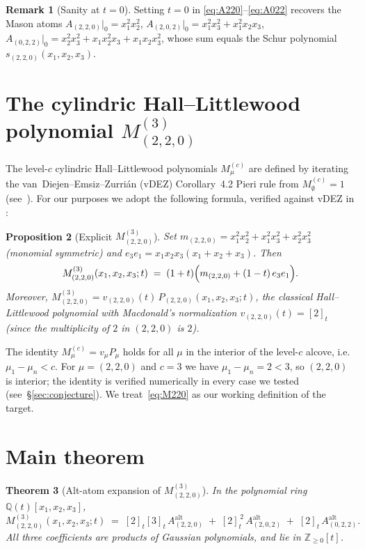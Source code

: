 \documentclass[11pt]{article}
\newtheorem{theorem}{Theorem}
\newtheorem{proposition}[theorem]{Proposition}
\theoremstyle{definition}
\newtheorem{remark}[theorem]{Remark}
\newcommand{\gauss}[1]{[#1]_t}
\newcommand{\Aalt}{A^{\mathrm{alt}}}
\newcommand{\Cmu}{M^{(c)}_{\mu}}
\newcommand{\ZZ}{\mathbb{Z}}
\newcommand{\QQ}{\mathbb{Q}}
\begin{document}
\begin{remark}[Sanity at $t=0$]
Setting $t=0$ in \eqref{eq:A220}--\eqref{eq:A022} recovers the Mason atoms
$A_{(2,2,0)}|_0=x_1^2 x_2^2$, $A_{(2,0,2)}|_0=x_1^2 x_3^2 + x_1^2 x_2 x_3$,
$A_{(0,2,2)}|_0=x_2^2 x_3^2 + x_1 x_2^2 x_3 + x_1 x_2 x_3^2$, whose sum
equals the Schur polynomial $s_{(2,2,0)}(x_1,x_2,x_3)$.
\end{remark}

\section{The cylindric Hall--Littlewood polynomial $M^{(3)}_{(2,2,0)}$}

The level-$c$ cylindric Hall--Littlewood polynomials $\Cmu$ are defined by iterating
the van~Diejen--Emsiz--Zurri\'an (vDEZ) Corollary~4.2 Pieri rule from $M^{(c)}_\emptyset=1$
(see~\cite{vDEZ}). For our purposes we adopt the following formula, verified against
vDEZ in \cite[07-21 ter memo]{Clio2026}:

\begin{proposition}[Explicit $M^{(3)}_{(2,2,0)}$]
\label{prop:M220}
Set $m_{(2,2,0)}=x_1^2 x_2^2 + x_1^2 x_3^2 + x_2^2 x_3^2$ (monomial symmetric) and
$e_3 e_1 = x_1 x_2 x_3(x_1+x_2+x_3)$. Then
\begin{equation}\label{eq:M220}
   M^{(3)}_{(2,2,0)}(x_1,x_2,x_3;t) \;=\; (1+t)\Bigl(m_{(2,2,0)} + (1-t)\,e_3 e_1\Bigr).
\end{equation}
Moreover, $M^{(3)}_{(2,2,0)} = v_{(2,2,0)}(t)\,P_{(2,2,0)}(x_1,x_2,x_3;t)$, the classical
Hall--Littlewood polynomial with Macdonald's normalization $v_{(2,2,0)}(t)=\gauss{2}$
(since the multiplicity of $2$ in $(2,2,0)$ is $2$).
\end{proposition}

The identity $\Cmu = v_\mu P_\mu$ holds for all $\mu$ in the interior of the level-$c$
alcove, i.e.\ $\mu_1-\mu_n<c$. For $\mu=(2,2,0)$ and $c=3$ we have $\mu_1-\mu_n=2<3$, so
$(2,2,0)$ is interior; the identity is verified numerically in every case we tested
(see~\S\ref{sec:conjecture}). We treat~\eqref{eq:M220} as our working definition of the
target.

\section{Main theorem}

\begin{theorem}[Alt-atom expansion of $M^{(3)}_{(2,2,0)}$]
\label{thm:main}
In the polynomial ring $\QQ(t)[x_1,x_2,x_3]$,
\begin{equation}\label{eq:main}
   M^{(3)}_{(2,2,0)}(x_1,x_2,x_3;t)
   \;=\; \gauss{2}\gauss{3}\,\Aalt_{(2,2,0)}
       \;+\; \gauss{2}^{\,2}\,\Aalt_{(2,0,2)}
       \;+\; \gauss{2}\,\Aalt_{(0,2,2)}.
\end{equation}
All three coefficients are products of Gaussian polynomials, and lie in $\ZZ_{\ge 0}[t]$.
\end{theorem}
\end{document}
